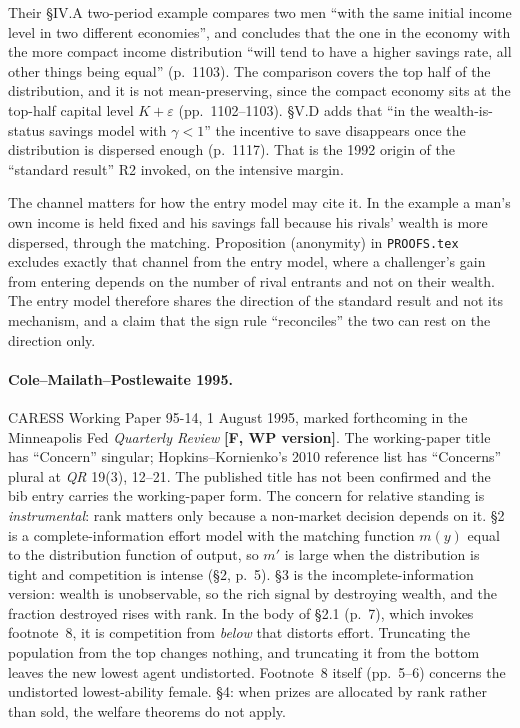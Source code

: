 \documentclass[11pt,a4paper]{article}
\begin{document}
Their \S IV.A two-period example compares two men ``with the same initial
income level in two different economies'', and concludes that the one in the
economy with the more compact income distribution ``will tend to have a higher
savings rate, all other things being equal'' (p.~1103). The comparison covers
the top half of the distribution, and it is not mean-preserving, since the
compact economy sits at the top-half capital level $K + \varepsilon$
(pp.~1102--1103). \S V.D adds that ``in the wealth-is-status savings model with
$\gamma < 1$'' the incentive to save disappears once the distribution is
dispersed enough (p.~1117). That is the 1992 origin of the ``standard result''
R2 invoked, on the intensive margin.

The channel matters for how the entry model may cite it. In the example a man's
own income is held fixed and his savings fall because his rivals' wealth is
more dispersed, through the matching. Proposition (anonymity) in
\texttt{PROOFS.tex} excludes exactly that channel from the entry model, where a
challenger's gain from entering depends on the number of rival entrants and not
on their wealth. The entry model therefore shares the direction of the standard
result and not its mechanism, and a claim that the sign rule ``reconciles'' the
two can rest on the direction only.

\paragraph{Cole--Mailath--Postlewaite 1995.} CARESS Working Paper 95-14,
1 August 1995, marked forthcoming in the Minneapolis Fed \emph{Quarterly
Review} \textbf{[F, WP version]}. The working-paper title has ``Concern''
singular; Hopkins--Kornienko's 2010 reference list has ``Concerns'' plural at
\emph{QR} 19(3), 12--21. The published title has not been confirmed and the
bib entry carries the working-paper form. The concern for relative standing is
\emph{instrumental}: rank matters only because a non-market decision depends
on it. \S 2 is a complete-information effort model with the matching function
$m(y)$ equal to the distribution function of output, so $m'$ is large when the
distribution is tight and competition is intense (\S 2, p.~5). \S 3 is the
incomplete-information version: wealth is unobservable, so the rich signal by
destroying wealth, and the fraction destroyed rises with rank. In the body of
\S 2.1 (p.~7), which invokes footnote~8, it is competition from \emph{below}
that distorts effort. Truncating the population from the top changes nothing,
and truncating it from the bottom leaves the new lowest agent undistorted.
Footnote~8 itself (pp.~5--6) concerns the undistorted lowest-ability female. \S 4: when prizes are allocated by rank
rather than sold, the welfare theorems do not apply.
\end{document}
